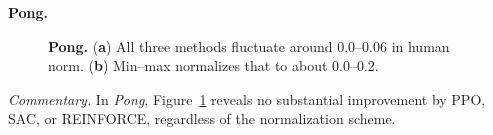 \noindent \textbf{Pong.}
\begin{figure}[htbp]
	\centering
	\quad
	\caption{\textbf{Pong.}
		(\textbf{a}) All three methods fluctuate around 0.0--0.06 in human norm.
		(\textbf{b}) Min--max normalizes that to about 0.0--0.2.}
	\label{fig:pong_combined}
\end{figure}

\noindent
\emph{Commentary.} In \emph{Pong}, Figure~\ref{fig:pong_combined} reveals no substantial improvement by PPO, SAC, or REINFORCE, regardless of the normalization scheme.

